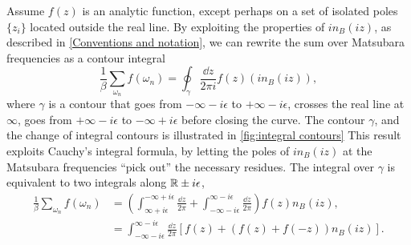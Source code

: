 Assume $f(z)$ is an analytic function, except perhaps on a set of isolated poles $\{z_i\}$ located outside the real line. 
By exploiting the properties of $i n_B(i z)$, as described in \autoref{Conventions and notation}, we can rewrite the sum over Matsubara frequencies as a contour integral
\begin{equation*}
    \frac{1}{\beta} \sum_{\omega_n} f(\omega_n) 
    = \oint_\gamma \frac{\dd z}{2 \pi i} f(z) (i n_B(i z)),
\end{equation*}
where $\gamma$ is a contour that goes from $- \infty - i \epsilon$ to $+ \infty - i \epsilon$, crosses the real line at $\infty$, goes from $+ \infty - i \epsilon$ to $- \infty + i \epsilon$ before closing the curve.
The contour $\gamma$, and the change of integral contours is illustrated in \autoref{fig:integral contours}
This result exploits Cauchy's integral formula, by letting the poles of $in_B(iz)$ at the Matsubara frequencies ``pick out'' the necessary residues.
The integral over $\gamma$ is equivalent to two integrals along $\mathbb{R} \pm i \epsilon$,
\begin{align*}
    \frac{1}{\beta} \sum_{\omega_n} f(\omega_n) 
    &= \left(
        \int_{\infty + i \epsilon}^{-\infty + i \epsilon} \frac{\dd z}{2 \pi} 
        + \int_{-\infty - i \epsilon}^{\infty - i \epsilon}\frac{\dd z}{2 \pi}
    \right) 
    f(z) n_B(i z),
    \\
    & = \int_{-\infty - i \epsilon}^{\infty - i \epsilon}\frac{\dd z}{2 \pi}
    \left[
        f(z) + \left(f(z) + f(-z)\right) n_B(iz)
    \right].
\end{align*}

